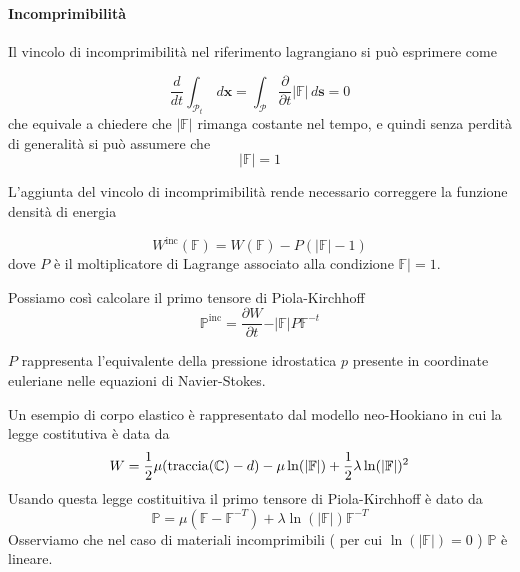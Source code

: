 \paragraph{Incomprimibilità}

Il vincolo di incomprimibilità nel riferimento lagrangiano si può esprimere come

\begin{equation*}
\frac{d}{dt}\int_{\mathcal{P}_t}\,d\mathbf{x} = \int_{\mathcal{P}}\frac{\partial}{\partial t}\vert\mathbb{F}\vert\,d\mathbf{s} = 0
\end{equation*}
che equivale a chiedere che $\vert\mathbb{F}\vert$ rimanga costante nel tempo, e quindi senza perdità di generalità si può assumere che 
\begin{equation*}
\vert \mathbb{F} \vert = 1
\end{equation*}

L'aggiunta del vincolo di incomprimibilità rende necessario correggere la funzione densità di energia

\begin{equation*}
W^{\text{inc}}(\mathbb{F}) = W(\mathbb{F})-P(\vert\mathbb{F}\vert - 1)
\end{equation*}
dove $P$ è il moltiplicatore di Lagrange associato alla condizione $\mathbb{F}\vert=1$.

Possiamo così calcolare il primo tensore di Piola-Kirchhoff
\begin{equation*}
\mathbb{P}^{\text{inc}}=\frac{\partial W}{\partial t}-\vert\mathbb{F}\vert P\mathbb{F}^{-t}
\end{equation*}

$P$ rappresenta l'equivalente della pressione idrostatica $p$ presente in coordinate euleriane nelle equazioni di Navier-Stokes.

Un esempio di corpo elastico è rappresentato dal modello neo-Hookiano in cui la legge costitutiva è data da
\begin{equation*}
W = \frac{1}{2}\mu(\operatorname{traccia}(\mathbb{C})-d)-\mu\ln(\vert\mathbb{F}\vert)+\frac{1}{2}\lambda\ln(\vert\mathbb{F}\vert)^2
\end{equation*}
Usando questa legge costituitiva il primo tensore di Piola-Kirchhoff è dato da
\begin{equation*}
\mathbb{P} = \mu(\mathbb{F}-\mathbb{F}^{-T})+\lambda\ln(\vert\mathbb{F}\vert)\mathbb{F}^{-T}
\end{equation*}
Osserviamo che nel caso di materiali incomprimibili ( per cui $\ln(\vert\mathbb{F}\vert)=0$ ) $\mathbb{P}$ è lineare.

